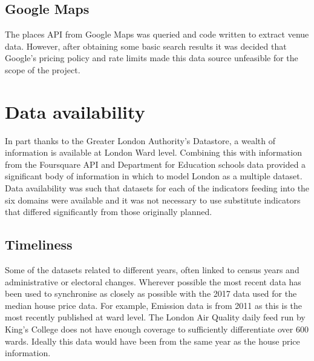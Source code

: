 
\subsection{Google Maps}
The places API from Google Maps was queried and code written to extract venue data. However, after obtaining some basic search results it was decided that Google's pricing policy and rate limits made this data source unfeasible for the scope of the project.


\section{Data availability}

In part thanks to the Greater London Authority’s Datastore, a wealth of information is available at London Ward level. Combining this with information from the Foursquare API and Department for Education schools data provided a significant body of information in which to model London as a multiple dataset.
Data availability was such that datasets for each of the indicators feeding into the six domains were available and it was not necessary to use substitute indicators that differed significantly from those originally planned. 

\subsection{Timeliness}

Some of the datasets related to different years, often linked to census years and administrative or electoral changes.
Wherever possible the most recent data has been used to synchronise as closely as possible with the 2017 data used for the median house price data. For example, Emission data is from 2011 as this is the most recently published at ward level. The London Air Quality daily feed run by King’s College does not have enough coverage to sufficiently differentiate over 600 wards. Ideally this data would have been from the same year as the house price information.


